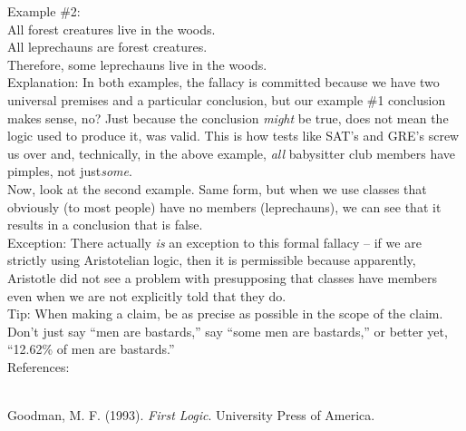\documentclass[a4paper,12pt,single,pdftex]{scrbook}
\begin{document}
    
      Example \#2: 
    \\

    
      All forest creatures live in the woods.
    \\

    
      All leprechauns are forest creatures.
    \\

    
      Therefore, some leprechauns live in the woods.
    \\

    
      Explanation: In both examples, the fallacy is committed because we have two universal premises and a particular conclusion, but our example \#1 conclusion makes sense, no?  Just because the conclusion {\it might}  be true, does not mean the logic used to produce it, was valid.  This is how tests like SAT’s and GRE’s screw us over and, technically, in the above example, {\it all} babysitter club members have pimples, not just{\it   some}.
    \\

    
      Now, look at the second example.  Same form, but when we use classes that obviously (to most people) have no members (leprechauns), we can see that it results in a conclusion that is false. 
    \\

    
      Exception: There actually {\it is} an exception to this formal fallacy -- if we are strictly using Aristotelian logic, then it is permissible because apparently, Aristotle did not see a problem with presupposing that classes have members even when we are not explicitly told that they do.
    \\

    
      Tip: When making a claim, be as precise as possible in the scope of the claim. Don’t just say “men are bastards,” say “some men are bastards,” or better yet, “12.62\% of men are bastards.”
    \\

    References:

    
      
        
      \\

      
        
          Goodman, M. F. (1993). {\it First Logic}. University Press of America.
        
      
    
\end{document}
